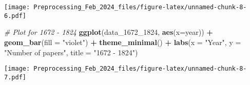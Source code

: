 \documentclass[
]{article}
\newenvironment{Shaded}{\begin{snugshade}}{\end{snugshade}}
\newcommand{\AttributeTok}[1]{\textcolor[rgb]{0.13,0.29,0.53}{#1}}
\newcommand{\CommentTok}[1]{\textcolor[rgb]{0.56,0.35,0.01}{\textit{#1}}}
\newcommand{\FunctionTok}[1]{\textcolor[rgb]{0.13,0.29,0.53}{\textbf{#1}}}
\newcommand{\NormalTok}[1]{#1}
\newcommand{\SpecialCharTok}[1]{\textcolor[rgb]{0.81,0.36,0.00}{\textbf{#1}}}
\newcommand{\StringTok}[1]{\textcolor[rgb]{0.31,0.60,0.02}{#1}}
\begin{document}
\texttt{[image: Preprocessing\_Feb\_2024\_files/figure-latex/unnamed-chunk-8-6.pdf]}

\begin{Shaded}
\begin{Highlighting}[]
\CommentTok{\# Plot for 1672 {-} 1824}
\FunctionTok{ggplot}\NormalTok{(data\_1672\_1824, }\FunctionTok{aes}\NormalTok{(}\AttributeTok{x=}\NormalTok{year)) }\SpecialCharTok{+}
  \FunctionTok{geom\_bar}\NormalTok{(}\AttributeTok{fill =} \StringTok{"violet"}\NormalTok{) }\SpecialCharTok{+}
  \FunctionTok{theme\_minimal}\NormalTok{() }\SpecialCharTok{+}
\FunctionTok{labs}\NormalTok{(}\AttributeTok{x =} \StringTok{"Year"}\NormalTok{, }\AttributeTok{y =} \StringTok{"Number of papers"}\NormalTok{, }\AttributeTok{title =} \StringTok{"1672 {-} 1824"}\NormalTok{)}
\end{Highlighting}
\end{Shaded}

\texttt{[image: Preprocessing\_Feb\_2024\_files/figure-latex/unnamed-chunk-8-7.pdf]}
\end{document}
